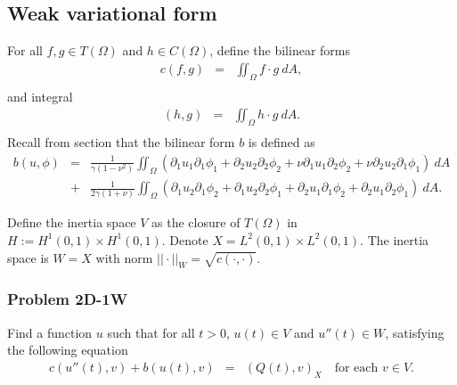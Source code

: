 \documentclass[../../main.tex]{subfiles}
\begin{document}
\subsection{Weak variational form}
For all $f,g \in T(\Omega)$ and $h \in C(\Omega)$, define the bilinear forms
\begin{eqnarray*}
	c(f,g) & = & \iint_\Omega f \cdot g \ dA, \\
\end{eqnarray*}
and integral
\begin{eqnarray*}
	(h,g) & = & \iint_\Omega h \cdot g \ dA. \\
\end{eqnarray*}
Recall from section  that the bilinear form $b$ is defined as
\begin{eqnarray*}
	b(u,\phi) & = & \frac{1}{\gamma(1-\nu^2)}\iint_{\Omega} (\partial_1 u_1 \partial_1 \phi_1 + \partial_2 u_2 \partial _2 \phi_2 + \nu\partial_1 u_1 \partial_2\phi_2 + \nu \partial_2 u_2 \partial_1 \phi_1 ) \ dA \\
	& + & \frac{1}{2\gamma(1+\nu)}\iint_{\Omega} (\partial_1 u_2 \partial_1 \phi_2 + \partial_1 u_2 \partial_2 \phi_1 + \partial_2 u_1 \partial_1\phi_2 + \partial_2 u_1 \partial_2\phi_1) \ dA.
\end{eqnarray*}

Define the inertia space $V$ as the closure of $T(\Omega)$ in $H := H^1(0,1)\times H^1(0,1)$. Denote $X = L^2(0,1)\times L^2(0,1)$. The inertia space is $W  = X$ with norm $||\cdot||_W = \sqrt{c(\cdot,\cdot)}$.

\subsubsection{Problem 2D-1W}
Find a function $u$ such that for all $t>0$, $u(t) \in V$ and $u''(t) \in W$, satisfying the following equation
\begin{eqnarray}
	c(u''(t),v) + b(u(t),v) & = & (Q(t),v)_X \ \ \ \textrm{ for each } v \in V.
\end{eqnarray}
\end{document}
